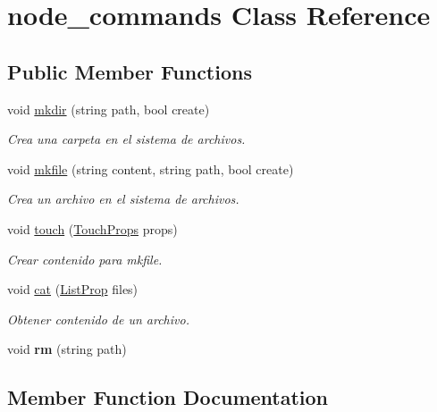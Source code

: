 \hypertarget{classnode__commands}{}\section{node\+\_\+commands Class Reference}
\label{classnode__commands}
\subsection*{Public Member Functions}
\begin{DoxyCompactItemize}
\item 
void \hyperlink{classnode__commands_ab9bab9521e403fe8b28ea735c6d1215d}{mkdir} (string path, bool create)
\begin{DoxyCompactList}\small\item\em Crea una carpeta en el sistema de archivos. \end{DoxyCompactList}\item 
void \hyperlink{classnode__commands_a53055970bb8b3d57a1b480f3114338cd}{mkfile} (string content, string path, bool create)
\begin{DoxyCompactList}\small\item\em Crea un archivo en el sistema de archivos. \end{DoxyCompactList}\item 
void \hyperlink{classnode__commands_a41ad336e0f91bf8d873c8939c428a911}{touch} (\hyperlink{structTouchProps}{Touch\+Props} props)
\begin{DoxyCompactList}\small\item\em Crear contenido para mkfile. \end{DoxyCompactList}\item 
void \hyperlink{classnode__commands_a049aebcc3a8b35f5ebe58aa9ee643223}{cat} (\hyperlink{structListProp}{List\+Prop} files)
\begin{DoxyCompactList}\small\item\em Obtener contenido de un archivo. \end{DoxyCompactList}\item 
\mbox{\label{classnode__commands_abddcc18dade7670ecaa3f1ae0a9165f3}} 
void {\bfseries rm} (string path)
\end{DoxyCompactItemize}


\subsection{Member Function Documentation}
\mbox{\label{classnode__commands_a049aebcc3a8b35f5ebe58aa9ee643223}} 
